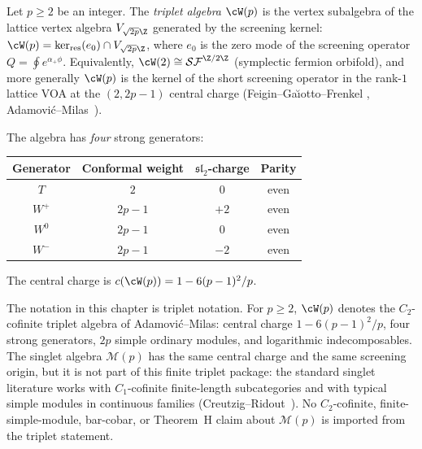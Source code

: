 \begin{definition}\label{def:wp-algebra}
Let $p \geq 2$ be an integer. The \emph{triplet algebra}
$\cW(p)$ is the vertex subalgebra of the lattice vertex
algebra $V_{\sqrt{2p}\Z}$ generated by the screening kernel:
$\cW(p) = \ker_{\mathrm{res}}(e_0) \cap V_{\sqrt{2p}\Z}$,
where $e_0$ is the zero mode of the screening operator
$Q = \oint e^{\alpha_{+}\phi}$.
Equivalently, $\cW(2) \cong
\mathcal{SF}^{\Z/2\Z}$ (symplectic fermion orbifold),
and more generally $\cW(p)$ is the kernel of the short
screening operator in the rank-$1$ lattice VOA at the
$(2,2p{-}1)$ central charge (Feigin--Ga\u{\i}otto--Frenkel
\cite{FGF2010}, Adamovi\'c--Milas~\cite{AdamovicMilas2008}).

The algebra has \emph{four} strong generators:
\begin{center}
\renewcommand{\arraystretch}{1.3}
\begin{tabular}{cccc}
\toprule
Generator & Conformal weight & $\mathfrak{sl}_2$-charge
 & Parity \\
\midrule
$T$ & $2$ & $0$ & even \\
$W^+$ & $2p-1$ & $+2$ & even \\
$W^0$ & $2p-1$ & $0$ & even \\
$W^-$ & $2p-1$ & $-2$ & even \\
\bottomrule
\end{tabular}
\end{center}
The central charge is $c(\cW(p)) = 1 - 6(p-1)^2/p$.
\end{definition}

\begin{remark}
\label{rem:wp-singlet-boundary}
The notation in this chapter is triplet notation. For $p\ge2$,
$\cW(p)$ denotes the $C_2$-cofinite triplet algebra of
Adamovi\'c--Milas: central charge $1-6(p-1)^2/p$, four strong
generators, $2p$ simple ordinary modules, and logarithmic
indecomposables. The singlet algebra $\mathcal M(p)$ has the same
central charge and the same screening origin, but it is not part of
this finite triplet package: the standard singlet literature works
with $C_1$-cofinite finite-length subcategories and with typical
simple modules in continuous families
\textup{(}Creutzig--Ridout~\cite{CreutzigRidout2013}\textup{)}.
No $C_2$-cofinite, finite-simple-module, bar-cobar, or Theorem~H
claim about $\mathcal M(p)$ is imported from the triplet statement.
\end{remark}

